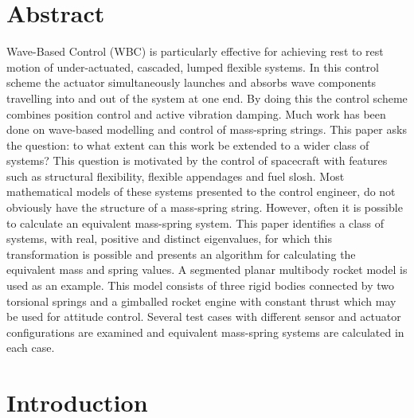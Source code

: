 \documentclass{mbd_fullpaper}
\begin{document}
\section*{Abstract}
Wave-Based Control (WBC) is particularly effective for achieving rest to rest motion of under-actuated, cascaded, lumped flexible systems.
In this control scheme the actuator simultaneously launches and absorbs wave components travelling into and out of the system at one end.
By doing this the control scheme combines position control and active vibration damping.
Much work has been done on wave-based modelling and control of mass-spring strings.
This paper asks the question: to what extent can this work be extended to a wider class of systems?
This question is motivated by the control of spacecraft with features such as structural flexibility, flexible appendages and fuel slosh.
Most mathematical models of these systems presented to the control engineer, do not obviously have the structure of a mass-spring string.
However, often it is possible to calculate an equivalent mass-spring system.
This paper identifies a class of systems, with real, positive and distinct eigenvalues, for which this transformation is possible and presents an algorithm for calculating the equivalent mass and spring values.
A segmented planar multibody rocket model is used as an example.
This model consists of three rigid bodies connected by two torsional springs and a gimballed rocket engine with constant thrust which may be used for attitude control.
Several test cases with different sensor and actuator configurations are examined and equivalent mass-spring systems are calculated in each case.

\section{Introduction}
\end{document}
